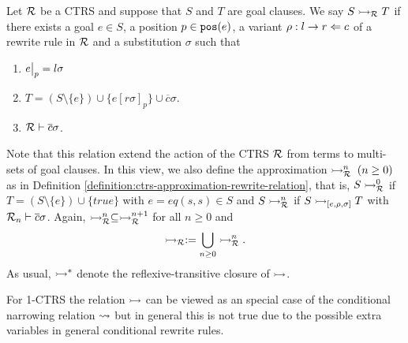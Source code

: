 \begin{definition}\label{definition:rewrite-on-goals}
	Let $\mathcal{R}$ be a CTRS and suppose that $S$ and $T$ are goal clauses. We say $S \rightarrowtail_{\mathcal{R}} T$ if there exists a goal $e \in S$, a position $p \in \mathtt{pos}(e)$, a variant $\rho : l \rightarrow r \Leftarrow c$ of a rewrite rule in $\mathcal{R}$ and a substitution $\sigma$ such that
	\begin{enumerate}
		\item $\restr{e}{p} = l \sigma$
		\item $T = (S \setminus \{e\}) \cup \{ e[r\sigma]_p \} \cup \overline{c} \sigma$.
		\item $\mathcal{R} \vdash \overline{c} \sigma$.
	\end{enumerate}
\end{definition}

Note that this relation extend the action of the CTRS $\mathcal{R}$ from terms to multi-sets of goal clauses. In this view, we also define the approximation $\rightarrowtail_{\mathcal{R}}^n \; (n \geq 0)$ as in Definition \ref{definition:ctrs-approximation-rewrite-relation}, that is, $S \rightarrowtail_{\mathcal{R}}^0$ if $T = (S \setminus \{e\}) \cup \{true\}$ with $e = eq(s,s) \in S$ and $S \rightarrowtail_{\mathcal{R}}^n$ if $S \rightarrowtail_{[e, \rho, \sigma]} T$ with $\mathcal{R}_n \vdash \overline{c} \sigma$. Again, $\rightarrowtail_{\mathcal{R}}^n \subseteq \rightarrowtail_{\mathcal{R}}^{n+1}$ for all $n \geq 0$ and
$$\rightarrowtail_{\mathcal{R}} := \bigcup\limits_{n \geq 0} \rightarrowtail_{\mathcal{R}}^n.$$
As usual, $\rightarrowtail^*$ denote the reflexive-transitive closure of $\rightarrowtail$.
\begin{remark}
	For 1-CTRS the relation $\rightarrowtail$ can be viewed as an special case of the conditional narrowing relation $\mathbin{\rightsquigarrow}$ but in general this is not true due to the possible extra variables in general conditional rewrite rules.
\end{remark}

